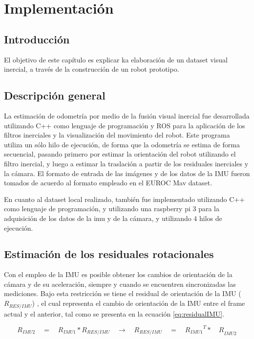 \chapter{Implementación}
\label{capitulo6}


\section{Introducción}
El objetivo de este capítulo es explicar ka elaboración de un dataset visual inercial, a través de la construcción de un robot prototipo.
\clearpage



\section{Descripción general}\label{seccion-corte}

La estimación de odometría por medio de la fusión visual inercial fue desarrollada utilizando C++ como lenguaje de programación y ROS para la aplicación de los filtros inerciales y la visualización del movimiento del robot. Este programa utiliza un sólo hilo de ejecución, de forma que la odometría se estima de forma secuencial, pasando primero por estimar la orientación del robot utilizando el filtro inercial, y luego a estimar la traslación a partir de los residuales inerciales y la cámara. El formato de entrada de las imágenes y de los datos de la IMU fueron tomados de acuerdo al formato empleado en el EUROC Mav dataset.

En cuanto al dataset local realizado, también fue implementado utilizando C++ como lenguaje de programación, y utilizando una raspberry pi 3 para la adquisición de los datos de la imu y de la cámara, y utilizando 4 hilos de ejecución.


\section{Estimación de los residuales rotacionales}

Con el empleo de la IMU es posible obtener los cambios de orientación de la cámara y de su aceleración, siempre y cuando se encuentren sincronizadas las mediciones. Bajo esta restricción se tiene el residual de orientación de la IMU (${R}_{RES/IMU}$) , el cual representa el cambio de orientación de la IMU entre el frame actual y el anterior, tal como se presenta en la ecuación \ref{eq:residualIMU}.


\begin{equation}
{ R }_{ IMU2 }\quad =\quad { R }_{ IMU1 }*{ R }_{ RES/IMU }\quad \rightarrow \quad { R }_{ RES/IMU }\quad =\quad { { { R }_{ IMU1 } }^{ T }*\quad R }_{ IMU2 }
\label{eq:residualIMU} 
\end{equation}

